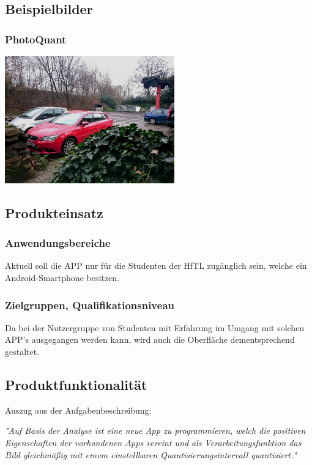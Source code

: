 \subsection{Beispielbilder}
\subsubsection{PhotoQuant}
\begin{center}
	\includegraphics[width=0.55\textwidth]{img/Fotos/FotoQuant_Midtread.jpg}
\end{center}

 

\subsection{\textbf{Produkteinsatz}}

\subsubsection{Anwendungsbereiche}
Aktuell soll die APP nur für die Studenten der \acs{HfTL} zugänglich sein, welche ein Android-Smartphone besitzen. 

\subsubsection{Zielgruppen, Qualifikationsniveau}

Da bei der Nutzergruppe von Studenten mit Erfahrung im Umgang mit solchen APP's ausgegangen werden kann, wird auch die Oberfläche dementsprechend gestaltet.

\subsection{\textbf{Produktfunktionalität}}

Auszug aus der Aufgabenbeschreibung:

\textit{"Auf Basis der Analyse ist eine neue App zu programmieren,
welch die positiven Eigenschaften der vorhandenen Apps vereint und als Verarbeitungsfunktion
das Bild gleichmäßig mit einem einstellbaren Quantisierungsintervall quantisiert."} 

